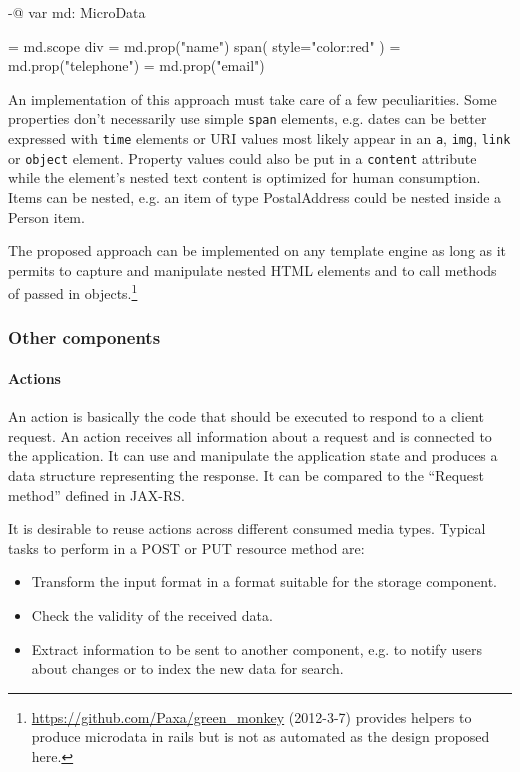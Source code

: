 \documentclass[12pt,a4paper]{scrartcl}		%
\newcommand{\citeurl}[2]{\url{#1} (#2)}
\begin{document}
\begin{anylisting}[label=fig:microdata-template,
                   caption={Using a Microdata-aware data structure in a template}]
-@ var md: MicroData

= md.scope
  div
    = md.prop("name")
      span( style="color:red" )
    = md.prop("telephone")
    = md.prop("email")
\end{anylisting}

An implementation of this approach must take care of a few
peculiarities\cite{Hickson2011}. Some properties don't necessarily use simple
\lstinline:span: elements, e.g. dates can be better expressed with
\lstinline:time: elements or URI values most likely appear in an
\lstinline:a:, \lstinline:img:, \lstinline:link: or \lstinline:object:
element. Property values could also be put in a \lstinline:content: attribute
while the element's nested text content is optimized for human
consumption. Items can be nested, e.g. an item of type PostalAddress could be
nested inside a Person item.

The proposed approach can be implemented on any template engine as long as it
permits to capture and manipulate nested HTML elements and to call methods of
passed in
objects.\footnote{\citeurl{https://github.com/Paxa/green_monkey}{2012-3-7}
  provides helpers to produce microdata in rails but is not as automated as the
  design proposed here.}

\subsubsection{Other components}

\paragraph{Actions}
\label{sec:components-actions}

An action is basically the code that should be executed to respond to a client
request. An action receives all information about a request and is connected to
the application. It can use and manipulate the application state and produces a
data structure representing the response. It can be compared to the ``Request
method'' defined in JAX-RS.


It is desirable to reuse actions across different consumed media types. Typical
tasks to perform in a POST or PUT resource method are:
\begin{itemize}
\item Transform the input format in a format suitable for the storage component.
\item Check the validity of the received data.
\item Extract information to be sent to another component, e.g. to notify users
  about changes or to index the new data for search.
\end{itemize}
\end{document}
